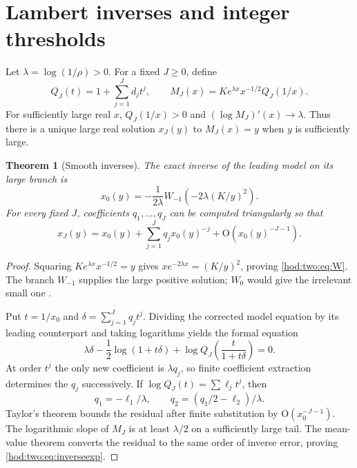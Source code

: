 \documentclass[11pt,letterpaper]{article}
\newtheorem{theorem}{Theorem}[section]
\theoremstyle{definition}\newtheorem{definition}[theorem]{Definition}
\theoremstyle{remark}\newtheorem{remark}[theorem]{Remark}
\newcommand{\bigO}{\mathrm O}
\begin{document}
\section{Lambert inverses and integer thresholds}\label{hod:two:sec:inverse}
Let $\lambda=\log(1/\rho)>0$. For a fixed $J\ge0$, define
\begin{equation}\label{hod:two:eq:model}
Q_J(t)=1+\sum_{j=1}^Jd_jt^j,\qquad
M_J(x)=K e^{\lambda x}x^{-1/2}Q_J(1/x).
\end{equation}
For sufficiently large real $x$, $Q_J(1/x)>0$ and $(\log M_J)'(x)\to\lambda$. Thus there is a unique large real solution $x_J(y)$ to $M_J(x)=y$ when $y$ is sufficiently large.

\begin{theorem}[Smooth inverses]\label{hod:two:thm:inverse}
The exact inverse of the leading model on its large branch is
\begin{equation}\label{hod:two:eq:W}
x_0(y)=-\frac1{2\lambda}
W_{-1}\!\left(-2\lambda(K/y)^2\right).
\end{equation}
For every fixed $J$, coefficients $q_1,\ldots,q_J$ can be computed triangularly so that
\begin{equation}\label{hod:two:eq:inverseexp}
x_J(y)=x_0(y)+\sum_{j=1}^Jq_jx_0(y)^{-j}
+\bigO(x_0(y)^{-J-1}).
\end{equation}
\end{theorem}
\begin{proof}
Squaring $K e^{\lambda x}x^{-1/2}=y$ gives $x e^{-2\lambda x}=(K/y)^2$, proving \eqref{hod:two:eq:W}. The branch $W_{-1}$ supplies the large positive solution; $W_0$ would give the irrelevant small one \cite{corless}.

Put $t=1/x_0$ and $\delta=\sum_{j=1}^Jq_jt^j$. Dividing the corrected model equation by its leading counterpart and taking logarithms yields the formal equation
\begin{equation}\label{hod:two:eq:invrec}
\lambda\delta-\frac12\log(1+t\delta)
+\log Q_J\!\left(\frac{t}{1+t\delta}\right)=0.
\end{equation}
At order $t^j$ the only new coefficient is $\lambda q_j$, so finite coefficient extraction determines the $q_j$ successively. If $\log Q_J(t)=\sum\ell_jt^j$, then
\[
q_1=-\ell_1/\lambda,\qquad
q_2=(q_1/2-\ell_2)/\lambda.
\]
Taylor's theorem bounds the residual after finite substitution by $\bigO(x_0^{-J-1})$. The logarithmic slope of $M_J$ is at least $\lambda/2$ on a sufficiently large tail. The mean-value theorem converts the residual to the same order of inverse error, proving \eqref{hod:two:eq:inverseexp}.
\end{proof}
\end{document}
